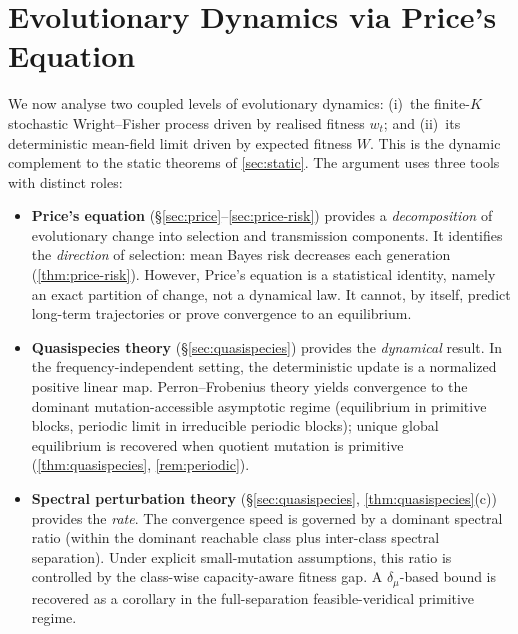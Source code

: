 \documentclass[12pt]{article}
\newcommand{\dmu}{\delta_\mu}
\begin{document}
\section{Evolutionary Dynamics via Price's Equation}\label{sec:evolution}

We now analyse two coupled levels of evolutionary dynamics: (i)~the finite-$K$ stochastic Wright--Fisher process driven by realised fitness $w_t$; and (ii)~its deterministic mean-field limit driven by expected fitness $W$. This is the dynamic complement to the static theorems of \cref{sec:static}. The argument uses three tools with distinct roles:

\begin{itemize}
\item \textbf{Price's equation} (\S\ref{sec:price}--\ref{sec:price-risk}) provides a \emph{decomposition} of evolutionary change into selection and transmission components. It identifies the \emph{direction} of selection: mean Bayes risk decreases each generation (\cref{thm:price-risk}). However, Price's equation is a statistical identity, namely an exact partition of change, not a dynamical law. It cannot, by itself, predict long-term trajectories or prove convergence to an equilibrium.

\item \textbf{Quasispecies theory} (\S\ref{sec:quasispecies}) provides the \emph{dynamical} result. In the frequency-independent setting, the deterministic update is a normalized positive linear map. Perron--Frobenius theory yields convergence to the dominant mutation-accessible asymptotic regime (equilibrium in primitive blocks, periodic limit in irreducible periodic blocks); unique global equilibrium is recovered when quotient mutation is primitive (\cref{thm:quasispecies}, \cref{rem:periodic}).

\item \textbf{Spectral perturbation theory} (\S\ref{sec:quasispecies}, \cref{thm:quasispecies}(c)) provides the \emph{rate}. The convergence speed is governed by a dominant spectral ratio (within the dominant reachable class plus inter-class spectral separation). Under explicit small-mutation assumptions, this ratio is controlled by the class-wise capacity-aware fitness gap. A $\dmu$-based bound is recovered as a corollary in the full-separation feasible-veridical primitive regime.
\end{itemize}
\end{document}
